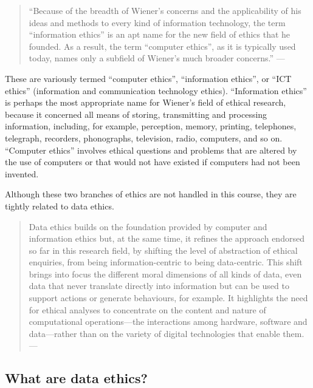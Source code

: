 \documentclass[
  12pt,
]{book}
\begin{document}
\begin{quote}
``Because of the breadth of Wiener's concerns and the applicability of his ideas and methods to every kind of information technology, the term ``information ethics'' is an apt name for the new field of ethics that he founded. As a result, the term ``computer ethics'', as it is typically used today, names only a subfield of Wiener's much broader concerns.'' --- \citep{sep-ethics-computer}
\end{quote}

These are variously termed ``computer ethics'', ``information ethics'', or ``ICT ethics'' (information and communication technology ethics). ``Information ethics'' is
perhaps the most appropriate name for Wiener's field of ethical research, because it concerned all means of storing, transmitting and processing information, including, for example, perception, memory, printing, telephones, telegraph, recorders, phonographs, television, radio, computers, and so on. ``Computer ethics'' involves ethical questions and problems that are altered by the use of computers or that would not have existed if computers had not been invented.

Although these two branches of ethics are not handled in this course, they are tightly related to data ethics.

\begin{quote}
Data ethics builds on the foundation provided by computer and information ethics but, at the same time, it refines the approach endorsed so far in this research field, by shifting the level of abstraction of ethical enquiries, from being information-centric to being data-centric. This shift brings into focus the different moral dimensions of all kinds of data, even data that never translate directly into information but can be used to support actions or generate behaviours, for example. It highlights the need for ethical analyses to concentrate on the content and nature of computational operations---the interactions among hardware, software and data---rather than on the variety of digital technologies that enable them. --- \citep{luciano2016data}
\end{quote}

\subsection{What are data ethics?}\label{what-are-data-ethics}
\end{document}
